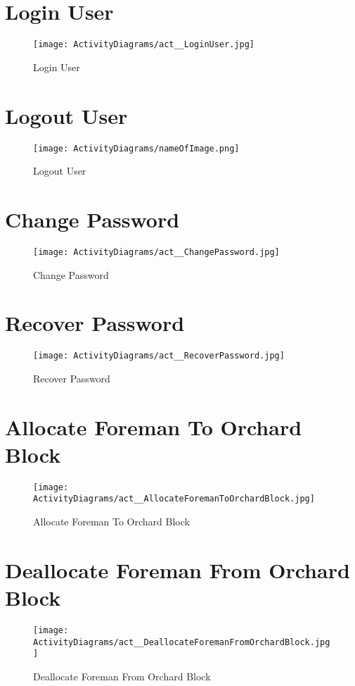 \documentclass[11pt,fleqn]{book} %
\begin{document}
\section{Login User}
\begin{figure}
	\texttt{[image: ActivityDiagrams/act\_\_LoginUser.jpg]}
	\caption{Login User}
\end{figure}

\section{Logout User}
\begin{figure}
	\texttt{[image: ActivityDiagrams/nameOfImage.png]}
	\caption{Logout User}
\end{figure}

\section{Change Password}
\begin{figure}
	\texttt{[image: ActivityDiagrams/act\_\_ChangePassword.jpg]}
	\caption{Change Password}
\end{figure}

\section{Recover Password}
\begin{figure}
	\texttt{[image: ActivityDiagrams/act\_\_RecoverPassword.jpg]}
	\caption{Recover Password}
\end{figure}

\section{Allocate Foreman To Orchard Block}
\begin{figure}
	\texttt{[image: ActivityDiagrams/act\_\_AllocateForemanToOrchardBlock.jpg]}
	\caption{Allocate Foreman To Orchard Block}
\end{figure}

\section{Deallocate Foreman From Orchard Block}
\begin{figure}
	\texttt{[image: ActivityDiagrams/act\_\_DeallocateForemanFromOrchardBlock.jpg]}
	\caption{Deallocate Foreman From Orchard Block}
\end{figure}
\end{document}
